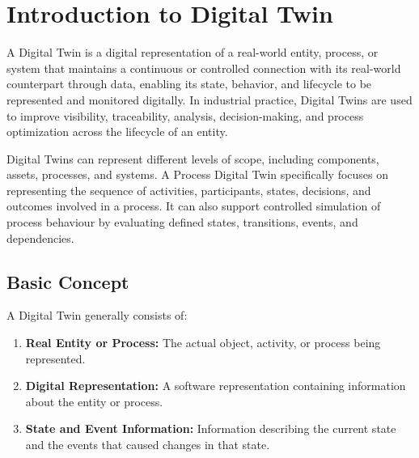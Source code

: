 \documentclass[12pt,a4paper]{article}
\begin{document}

\newpage

\tableofcontents

\newpage


\section{Introduction to Digital Twin}

A Digital Twin is a digital representation of a real-world entity, process, or system that maintains a continuous or controlled connection with its real-world counterpart through data, enabling its state, behavior, and lifecycle to be represented and monitored digitally. In industrial practice, Digital Twins are used to improve visibility, traceability, analysis, decision-making, and process optimization across the lifecycle of an entity.

Digital Twins can represent different levels of scope, including components, assets, processes, and systems. A Process Digital Twin specifically focuses on representing the sequence of activities, participants, states, decisions, and outcomes involved in a process. It can also support controlled simulation of process behaviour by evaluating defined states, transitions, events, and dependencies.

\subsection{Basic Concept}

A Digital Twin generally consists of:

\begin{enumerate}
    \item \textbf{Real Entity or Process:} The actual object,
    activity, or process being represented.

    \item \textbf{Digital Representation:} A software
    representation containing information about the entity or
    process.

    \item \textbf{State and Event Information:} Information
    describing the current state and the events that caused changes
    in that state.
\end{enumerate}
\end{document}
